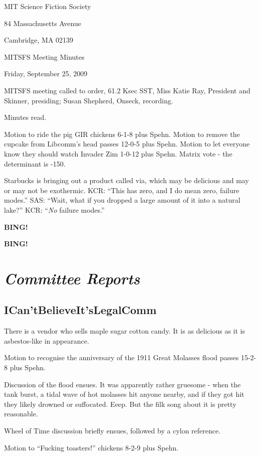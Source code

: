 \documentclass[10pt]{article}
\newcommand{\bing}{{\bf BING!} }
\newcommand{\goto}[1]{\bing \vskip 12pt \section*{{\em{#1}}}}
\newcommand{\ps}{ plus Spehn\xspace}
\begin{document}
\begin{center}

MIT Science Fiction Society

84 Massachusetts Avenue

Cambridge, MA 02139

\vspace{12pt}

MITSFS Meeting Minutes

Friday, September 25, 2009

\end{center}

\vspace{18pt}

\setlength{\parskip}{6pt}

\noindent
MITSFS meeting called to order, 61.2 Ksec SST,
Miss Katie Ray, President and Skinner, presiding; Susan Shepherd, Onseck, recording.

Minutes read.

Motion to ride the pig GIR chickens 6-1-8\ps.
Motion to remove the cupcake from Libcomm's head passes 12-0-5\ps. 
Motion to let everyone know they should watch Invader Zim 1-0-12\ps.
Matrix vote - the determinant is -150.

Starbucks is bringing out a product called via, which may be delicious and may or may not be exothermic. KCR: ``This has zero, and I do mean zero, failure modes.'' SAS: ``Wait, what if you dropped a large amount of it into a natural lake?'' KCR: ``\emph{No} failure modes.''


\bing

\goto{Committee Reports}

\subsection*{ICan'tBelieveIt'sLegalComm}
There is a vendor who sells maple sugar cotton candy. It is as delicious as it is asbestos-like in appearance.

Motion to recognise the anniversary of the 1911 Great Molasses flood passes 15-2-8\ps.

Discussion of the flood ensues. It was apparently rather gruesome - when the tank burst, a tidal wave of hot molasses hit anyone nearby, and if they got hit they likely drowned or suffocated. Eeep. But the filk song about it is pretty reasonable.

Wheel of Time discussion briefly ensues, followed by a cylon reference.

Motion to ``Fucking toasters!'' chickens 8-2-9\ps. 
\end{document}
